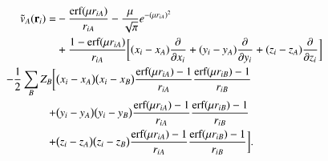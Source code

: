 \documentclass[aip,jcp,reprint,noshowkeys,superscriptaddress]{revtex4-1}
\newcommand{\deriv}[3]{\frac{\partial^{#3} #1}{\partial {#2}^{#3}}}
\begin{document}
\begin{equation}
 \label{eq:final_one_e_v}
 \begin{aligned}
  \tilde{v}_A({\bf r}_i) = & -\frac{\text{erf}(\mu r_{iA})}{r_{iA}} - \frac{\mu}{\sqrt{\pi}} e^{-(\mu r_{iA})^2} \\
           &+  \frac{1 - \text{erf}(\mu r_{iA})}{r_{iA}} \bigg[ (x_i - x_A) \deriv{}{x_i}{} + (y_i - y_A) \deriv{}{y_i}{} + (z_i - z_A) \deriv{}{z_i}{}\bigg] \\
           - \frac{1}{2}\sum_{B} Z_B\bigg[& \big( x_i - x_A \big) \big( x_i - x_B \big)  \frac{\text{erf}(\mu r_{iA}) - 1}{r_{iA}} \frac{\text{erf}(\mu r_{iB}) - 1}{r_{iB}} \\
           +&  \big( y_i - y_A \big) \big( y_i - y_B \big)  \frac{\text{erf}(\mu r_{iA}) - 1}{r_{iA}} \frac{\text{erf}(\mu r_{iB}) - 1}{r_{iB}} \\ 
           +&  \big( z_i - z_A \big) \big( z_i - z_B \big)  \frac{\text{erf}(\mu r_{iA}) - 1}{r_{iA}} \frac{\text{erf}(\mu r_{iB}) - 1}{r_{iB}}\bigg].
 \end{aligned}
\end{equation}
\end{document}
